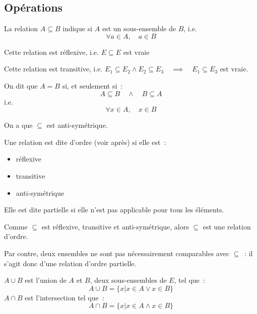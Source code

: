 \documentclass[a4paper, titlepage]{article}
\begin{document}
    \subsection{Opérations}
    \begin{defn}
        La relation $A\subseteq B$ indique si $A$ est un sous-ensemble de $B$, i.e.
        $$ \forall a\in A,\quad a\in B $$
    \end{defn}
    \begin{props}
        Cette relation est réflexive, i.e. $E\subseteq E$ est vraie
    \end{props}
    \begin{defn}
        Cette relation est transitive, i.e.
        $E_1\subseteq E_2\land E_2\subseteq E_3\quad\implies\quad E_1\subseteq E_3$ est vraie.
    \end{defn}
    \begin{defn}
        On dit que $A=B$ si, et seulement si~:
        $$ A\subseteq B\quad\land\quad B\subseteq A $$
        i.e.
        $$ \forall x\in A,\quad x\in B $$
    \end{defn}
    \begin{props}
        On a que $\subseteq$ est anti-symétrique.
    \end{props}
    \begin{defn}
        Une relation est dite d'ordre (voir après) si elle est~:
        \begin{itemize}
            \item réflexive
            \item transitive
            \item anti-symétrique
        \end{itemize}
        Elle est dite partielle si elle n'est pas applicable pour tous les éléments.
    \end{defn}
    \begin{props}
        Comme $\subseteq$ est réflexive, transitive et anti-symétrique, alors $\subseteq$ est une relation d'ordre.

        Par contre, deux ensembles ne sont pas nécessairement comparables avec $\subseteq$~: il s'agit donc d'une relation d'ordre partielle.
    \end{props}
    \begin{defn}
        $A\cup B$ est l'union de $A$ et $B$, deux sous-ensembles de $E$, tel que~:
        $$ A\cup B = \{x| x\in A\lor x\in B\} $$
        $A\cap B$ est l'intersection tel que~:
        $$ A\cap B = \{x| x\in A\land x\in B\} $$
    \end{defn}
\end{document}
